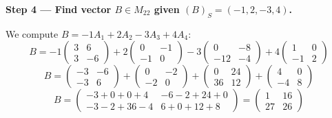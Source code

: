 \documentclass[12pt,a3paper]{article}
\begin{document}
\begin{tcolorbox}[enhanced,breakable,colback=cC!4,colframe=cC,
  boxrule=0.8pt,arc=5pt,
  title={\textbf{Answer}},
  fonttitle=\bfseries\color{white},colbacktitle=cC]
\medskip
\textbf{Step 4 --- Find vector $B \in M_{22}$ given $(B)_S = (-1,2,-3,4)$.}

We compute $B = -1 A_1 + 2 A_2 - 3 A_3 + 4 A_4$:
\[
B = -1\begin{pmatrix}3&6\\3&-6\end{pmatrix}
+ 2\begin{pmatrix}0&-1\\-1&0\end{pmatrix}
- 3\begin{pmatrix}0&-8\\-12&-4\end{pmatrix}
+ 4\begin{pmatrix}1&0\\-1&2\end{pmatrix}
\]
\[
B = \begin{pmatrix}-3&-6\\-3&6\end{pmatrix}
+ \begin{pmatrix}0&-2\\-2&0\end{pmatrix}
+ \begin{pmatrix}0&24\\36&12\end{pmatrix}
+ \begin{pmatrix}4&0\\-4&8\end{pmatrix}
\]
\[
B = \begin{pmatrix}-3+0+0+4 & -6-2+24+0 \\ -3-2+36-4 & 6+0+12+8\end{pmatrix} 
= \begin{pmatrix}1&16\\27&26\end{pmatrix}
\]

\end{tcolorbox}
\end{document}
